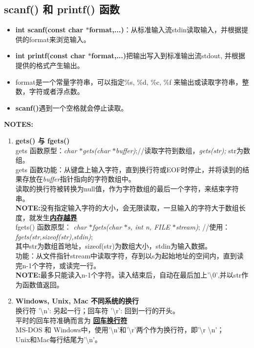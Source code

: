 \documentclass[UTF8]{ctexart}
\begin{document}
			\subsection{scanf() 和 printf() 函数}
			\begin{itemize}
				\item \textbf{int scanf(const char $*$format,...)}：从标准输入流stdin读取输入，并根据提供的format来浏览输入。
				\item \textbf{int printf(const char $*$format,...)}把输出写入到标准输出流stdout, 并根据提供的格式产生输出。
				\item format是一个常量字符串，可以指定\%s, \%d, \%c, \%f 来输出或读取字符串，整数，字符或者浮点数。
				\item \textbf{scanf()}遇到一个空格就会停止读取。
			\end{itemize}
			\begin{framed}
				\textbf{NOTES:}\\
				\begin{enumerate}
					\item \textbf{gets() 与 fgets()}\\gets 函数原型：\emph{char $*$gets(char $*$buffer)};//读取字符到数组，\emph{gets(str);} str为数组。\\gets 函数功能：从键盘上输入字符，直到换行符或EOF时停止，并将读到的结果存放在\emph{buffer}指针指向的字符数组中。\\读取的换行符被转换为null值，作为字符数组的最后一个字符，来结束字符串。\\ \textbf{NOTE:}没有指定输入字符的大小，会无限读取，一旦输入的字符大于数组长度，就发生\underline{\textbf{内存越界}}\\fgets() 函数原型： \emph{char $*$fgets(char $*$s, int n, FILE $*$stream)}; //使用：\emph{fgets(str,sizeof(str),stdin)};\\其中str为数组首地址，sizeof(str)为数组大小，stdin为输入数据。\\ 功能：从文件指针stream中读取字符，存到以s为起始地址的空间内，直到读完n-1个字符，或读完一行。\\ \textbf{NOTE:}最多只能读入n-1个字符。读入结束后，自动在最后加上'\textbackslash0',并以str作为函数值返回。
					\item \textbf{Windows, Unix, Mac 不同系统的换行}\\ 换行符 '\textbackslash n': 另起一行；回车符 '\textbackslash r': 回到一行的开头。\\ 平时的回车符准确而言为 \textbf{\underline{回车换行符}}\\ MS-DOS 和 Windows中，使用'\textbackslash n'和'\textbackslash r'两个作为换行符，即'\textbackslash r \textbackslash n'；\\Unix和Mac每行结尾为'\textbackslash n'。

\end{enumerate}
\end{framed}
\end{document}
